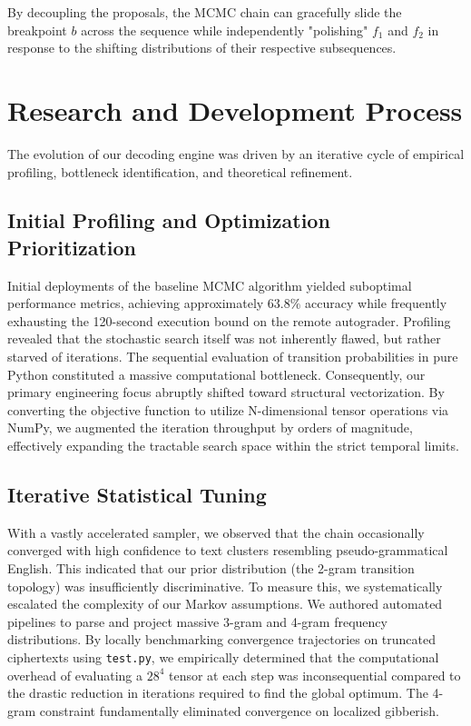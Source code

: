 \documentclass[11pt]{article}
\begin{document}
By decoupling the proposals, the MCMC chain can gracefully slide the breakpoint $b$ across the sequence while independently "polishing" $f_1$ and $f_2$ in response to the shifting distributions of their respective subsequences.

\section{Research and Development Process}

The evolution of our decoding engine was driven by an iterative cycle of empirical profiling, bottleneck identification, and theoretical refinement.

\subsection{Initial Profiling and Optimization Prioritization}
Initial deployments of the baseline MCMC algorithm yielded suboptimal performance metrics, achieving approximately $63.8\%$ accuracy while frequently exhausting the 120-second execution bound on the remote autograder. Profiling revealed that the stochastic search itself was not inherently flawed, but rather starved of iterations. The sequential evaluation of transition probabilities in pure Python constituted a massive computational bottleneck. Consequently, our primary engineering focus abruptly shifted toward structural vectorization. By converting the objective function to utilize N-dimensional tensor operations via NumPy, we augmented the iteration throughput by orders of magnitude, effectively expanding the tractable search space within the strict temporal limits.

\subsection{Iterative Statistical Tuning}
With a vastly accelerated sampler, we observed that the chain occasionally converged with high confidence to text clusters resembling pseudo-grammatical English. This indicated that our prior distribution (the 2-gram transition topology) was insufficiently discriminative. To measure this, we systematically escalated the complexity of our Markov assumptions. We authored automated pipelines to parse and project massive 3-gram and 4-gram frequency distributions. By locally benchmarking convergence trajectories on truncated ciphertexts using \texttt{test.py}, we empirically determined that the computational overhead of evaluating a $28^4$ tensor at each step was inconsequential compared to the drastic reduction in iterations required to find the global optimum. The 4-gram constraint fundamentally eliminated convergence on localized gibberish.
\end{document}

